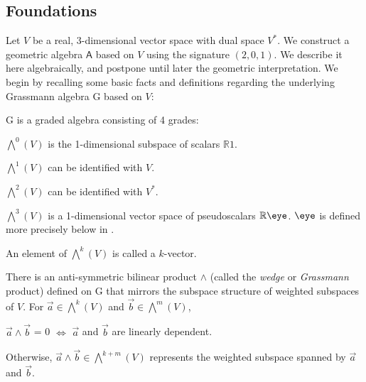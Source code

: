 \documentclass[12pt]{article}
\newcommand{\vsp}{V\xspace}
\begin{document}
\subsection{Foundations}
Let ${V}$ be a real, 3-dimensional vector space with dual space ${V}^{*}$.  We construct a geometric algebra $\textsf{A}$ based on ${V}$ using the signature $(2,0,1)$. We describe it here algebraically, and postpone until later the geometric interpretation. We begin by recalling some basic facts and definitions regarding the underlying Grassmann algebra \textsf{G} based on $V$:
\begin{compactenum}[$\bullet$]
\item \textsf{G} is a graded algebra consisting of 4 grades:
\begin{compactenum}[$\cdot$]
\item  $\bigwedge^{0}({V})$ is the 1-dimensional subspace of scalars $\mathbb{R}1$.
\item  $\bigwedge^{1}({V})$ can be identified with ${V}$.
\item $\bigwedge^{2}({V})$ can be identified with ${V}^{*}$. 
\item $\bigwedge^{3}({V})$ is a 1-dimensional vector space of pseudoscalars $\mathbb{R}\eye$. $\eye$ is defined more precisely below in . %
\end{compactenum}
\item An element of  $\bigwedge^{k}({V})$ is called a $k$-vector.
\item There is an anti-symmetric bilinear product $\wedge$ (called the \emph{wedge} or \emph{Grassmann} product) defined on \textsf{G} that mirrors the subspace structure of weighted subspaces of $V$. For $\vec{a} \in   \bigwedge^{k}({V})$ and $\vec{b} \in  \bigwedge^{m}({V})$, 
\begin{compactenum}[$\cdot$]
\item  $\vec{a}\wedge\vec{b}$ = 0 $\iff$ $\vec{a}$ and $\vec{b}$ are linearly dependent.
\item  Otherwise, $\vec{a}\wedge\vec{b} \in \bigwedge^{k+m}({V})$ represents the weighted subspace spanned by $\vec{a}$ and $\vec{b}$.
\end{compactenum}

\end{compactenum}
\end{document}
